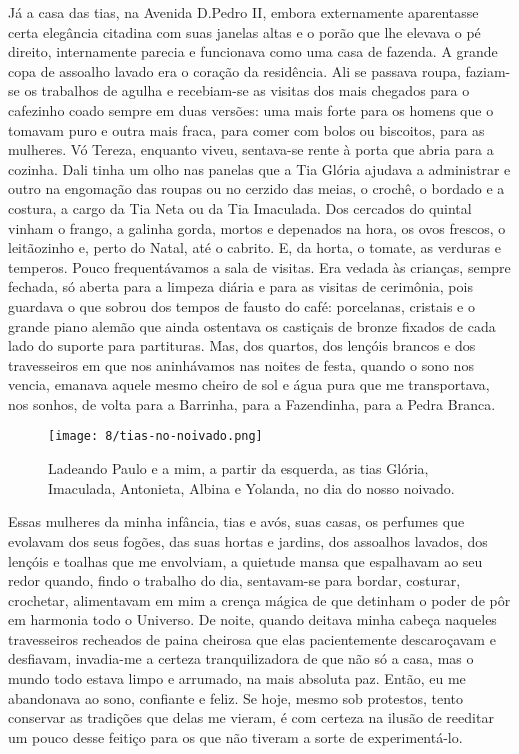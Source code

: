 Já a casa das tias, na Avenida D.Pedro II, embora externamente aparentasse certa elegância citadina com suas janelas altas e o porão que lhe elevava o pé direito, internamente parecia e funcionava como uma casa de fazenda.
A grande copa de assoalho lavado era o coração da residência.
Ali se passava roupa, faziam-se os trabalhos de agulha e recebiam-se as visitas dos mais chegados para o cafezinho coado sempre em duas versões: uma mais forte para os homens que o tomavam puro e outra mais fraca, para comer com bolos ou biscoitos, para as mulheres.
Vó Tereza, enquanto viveu, sentava-se rente à porta que abria para a cozinha.
Dali tinha um olho nas panelas que a Tia Glória ajudava a administrar e outro na engomação das roupas ou no cerzido das meias, o crochê, o bordado e a costura, a cargo da Tia Neta ou da Tia Imaculada.
Dos cercados do quintal vinham o frango, a galinha gorda, mortos e depenados na hora, os ovos frescos, o leitãozinho e, perto do Natal, até o cabrito.
E, da horta, o tomate, as verduras e temperos.
Pouco frequentávamos a sala de visitas.
Era vedada às crianças, sempre fechada, só aberta para a limpeza diária e para as visitas de cerimônia, pois guardava o que sobrou dos tempos de fausto do café: porcelanas, cristais e o grande piano alemão que ainda ostentava os castiçais de bronze fixados de cada lado do suporte para partituras.
Mas, dos quartos, dos lençóis brancos e dos travesseiros em que nos aninhávamos nas noites de festa, quando o sono nos vencia, emanava aquele mesmo cheiro de sol e água pura que me transportava, nos sonhos, de volta para a Barrinha, para a Fazendinha, para a Pedra Branca.

\begin{figure}[H]
\centering
\texttt{[image: 8/tias-no-noivado.png]}
\caption{Ladeando Paulo e a mim, a partir da esquerda, as tias Glória, Imaculada, Antonieta, Albina e Yolanda, no dia do nosso noivado.}
\end{figure}

Essas mulheres da minha infância, tias e avós, suas casas, os perfumes que evolavam dos seus fogões, das suas hortas e jardins, dos assoalhos lavados, dos lençóis e toalhas que me envolviam, a quietude mansa que espalhavam ao seu redor quando, findo o trabalho do dia, sentavam-se para bordar, costurar, crochetar, alimentavam em mim a crença mágica de que detinham o poder de pôr em harmonia todo o Universo.
De noite, quando deitava minha cabeça naqueles travesseiros recheados de paina cheirosa que elas pacientemente descaroçavam e desfiavam, invadia-me a certeza tranquilizadora de que não só a casa, mas o mundo todo estava limpo e arrumado, na mais absoluta paz.
Então, eu me abandonava ao sono, confiante e feliz.
Se hoje, mesmo sob protestos, tento conservar as tradições que delas me vieram, é com certeza na ilusão de reeditar um pouco desse feitiço para os que não tiveram a sorte de experimentá-lo.
